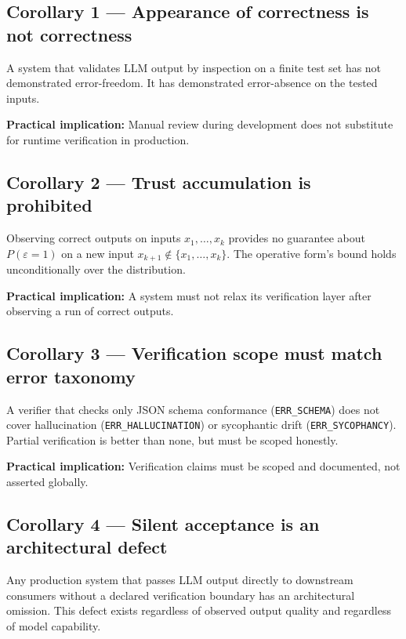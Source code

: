 \documentclass[11pt,a4paper]{article}
\begin{document}
\subsection{Corollary 1 --- Appearance of correctness is not correctness}

A system that validates LLM output by inspection on a finite test set has not demonstrated error-freedom. It has demonstrated error-absence on the tested inputs.

\textbf{Practical implication:} Manual review during development does not substitute for runtime verification in production.

\subsection{Corollary 2 --- Trust accumulation is prohibited}

Observing correct outputs on inputs $x_1, \ldots, x_k$ provides no guarantee about $P(\varepsilon = 1)$ on a new input $x_{k+1} \notin \{x_1, \ldots, x_k\}$. The operative form's bound holds unconditionally over the distribution.

\textbf{Practical implication:} A system must not relax its verification layer after observing a run of correct outputs.

\subsection{Corollary 3 --- Verification scope must match error taxonomy}

A verifier that checks only JSON schema conformance (\texttt{ERR\_SCHEMA}) does not cover hallucination (\texttt{ERR\_HALLUCINATION}) or sycophantic drift (\texttt{ERR\_SYCOPHANCY}). Partial verification is better than none, but must be scoped honestly.

\textbf{Practical implication:} Verification claims must be scoped and documented, not asserted globally.

\subsection{Corollary 4 --- Silent acceptance is an architectural defect}

Any production system that passes LLM output directly to downstream consumers without a declared verification boundary has an architectural omission. This defect exists regardless of observed output quality and regardless of model capability.
\end{document}
